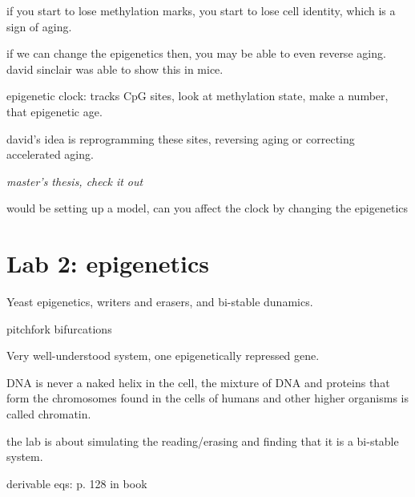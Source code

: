 \documentclass{article}
\begin{document}
if you start to lose methylation marks, you start to lose cell identity, which is a sign of aging. 

if we can change the epigenetics then, you may be able to even reverse aging. david sinclair was able to show this in mice. 

epigenetic clock: tracks CpG sites, look at methylation state, make a number, that epigenetic age. 

david's idea is reprogramming these sites, reversing aging or correcting accelerated aging. 

\textit{ master's thesis, check it out }

would be setting up a model, can you affect the clock by changing the epigenetics 



\section{Lab 2: epigenetics}
Yeast epigenetics, writers and erasers, and bi-stable dunamics. 

pitchfork bifurcations

Very well-understood system, one epigenetically repressed gene. 

DNA is never a naked helix in the cell, the mixture of DNA and proteins that form the chromosomes found in the cells of humans and other higher organisms is called chromatin. 

the lab is about simulating the reading/erasing and finding that it is a bi-stable system. 


derivable eqs: p. 128 in book 
\end{document}
